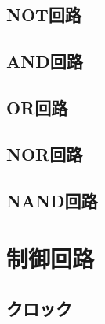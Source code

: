     \subsection{NOT回路}

    \subsection{AND回路}

    \subsection{OR回路}

    \subsection{NOR回路}

    \subsection{NAND回路}


    \section{制御回路}
    \subsection{クロック}

